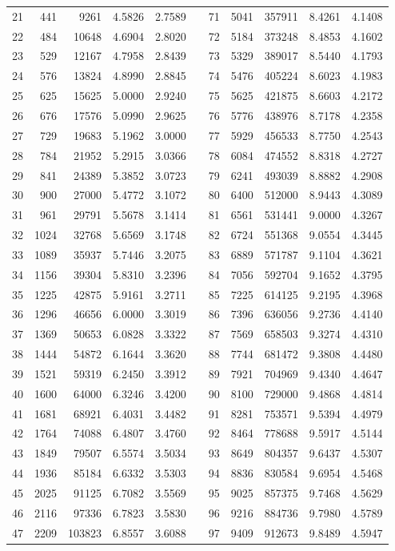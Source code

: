 \begin{longtable}{rrrrrrrrrrr}
21&441&9261&4.5826&2.7589&&71&5041&357911&8.4261&4.1408\\
22&484&10648&4.6904&2.8020&&72&5184&373248&8.4853&4.1602\\
23&529&12167&4.7958&2.8439&&73&5329&389017&8.5440&4.1793\\
24&576&13824&4.8990&2.8845&&74&5476&405224&8.6023&4.1983\\
25&625&15625&5.0000&2.9240&&75&5625&421875&8.6603&4.2172\\
26&676&17576&5.0990&2.9625&&76&5776&438976&8.7178&4.2358\\
27&729&19683&5.1962&3.0000&&77&5929&456533&8.7750&4.2543\\
28&784&21952&5.2915&3.0366&&78&6084&474552&8.8318&4.2727\\
29&841&24389&5.3852&3.0723&&79&6241&493039&8.8882&4.2908\\
30&900&27000&5.4772&3.1072&&80&6400&512000&8.9443&4.3089\\
31&961&29791&5.5678&3.1414&&81&6561&531441&9.0000&4.3267\\
32&1024&32768&5.6569&3.1748&&82&6724&551368&9.0554&4.3445\\
33&1089&35937&5.7446&3.2075&&83&6889&571787&9.1104&4.3621\\
34&1156&39304&5.8310&3.2396&&84&7056&592704&9.1652&4.3795\\
35&1225&42875&5.9161&3.2711&&85&7225&614125&9.2195&4.3968\\
36&1296&46656&6.0000&3.3019&&86&7396&636056&9.2736&4.4140\\
37&1369&50653&6.0828&3.3322&&87&7569&658503&9.3274&4.4310\\
38&1444&54872&6.1644&3.3620&&88&7744&681472&9.3808&4.4480\\
39&1521&59319&6.2450&3.3912&&89&7921&704969&9.4340&4.4647\\
40&1600&64000&6.3246&3.4200&&90&8100&729000&9.4868&4.4814\\
41&1681&68921&6.4031&3.4482&&91&8281&753571&9.5394&4.4979\\
42&1764&74088&6.4807&3.4760&&92&8464&778688&9.5917&4.5144\\
43&1849&79507&6.5574&3.5034&&93&8649&804357&9.6437&4.5307\\
44&1936&85184&6.6332&3.5303&&94&8836&830584&9.6954&4.5468\\
45&2025&91125&6.7082&3.5569&&95&9025&857375&9.7468&4.5629\\
46&2116&97336&6.7823&3.5830&&96&9216&884736&9.7980&4.5789\\
47&2209&103823&6.8557&3.6088&&97&9409&912673&9.8489&4.5947\\

\end{longtable}
